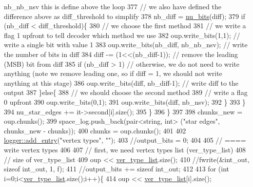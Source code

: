 \begin{DoxyCode}
{       nb\_nb\_nsv this is define above the loop}
377         \textcolor{comment}{// we also have defined the difference above as diff\_threshold to simplify}
378         nb\_diff = \hyperlink{bitstream_8cpp_a9dfce6f51e3febb3973aa3b16c2fecb4}{nu\_bits}(diff);
379         \textcolor{keywordflow}{if} (nb\_diff < diff\_threshold)\{
380           \textcolor{comment}{// we choose the first method}
381           \textcolor{comment}{// we write a flag 1 upfront to tell decoder which method we use}
382           oup.write\_bits(1,1); \textcolor{comment}{// write a single bit with value 1}
383           oup.write\_bits(nb\_diff, nb\_nb\_nsv); \textcolor{comment}{// write the number of bits in diff }
384           diff -= (1<<(nb\_diff-1)); \textcolor{comment}{// remove the leading (MSB) bit from diff}
385           \textcolor{keywordflow}{if} (nb\_diff > 1) \textcolor{comment}{// otherwise, we do not need to write anything (note we remove leading one, so
       if diff = 1, we should not write anything at this stage)}
386             oup.write\_bits(diff, nb\_diff-1); \textcolor{comment}{// write diff to the output}
387         \}\textcolor{keywordflow}{else}\{
388           \textcolor{comment}{// we should choose the second method}
389           \textcolor{comment}{// write a flag 0 upfront}
390           oup.write\_bits(0,1);
391           oup.write\_bits(diff, nb\_nsv);
392         \}
393       \}
394       nu\_star\_edges += it->second[i].size();
395     \}
396   \}
397   
398   chunks\_new = oup.chunks();
399   space\_log.push\_back(pair<string, int> (\textcolor{stringliteral}{"star edges"}, chunks\_new - chunks));
400   chunks = oup.chunks();
401 
402   \hyperlink{classlogger_a710163deb17bc81f70d53d285b8ac9ac}{logger::add\_entry}(\textcolor{stringliteral}{"vertex types"}, \textcolor{stringliteral}{""});
403   \textcolor{comment}{//output\_bits = 0;}
404   
405   \textcolor{comment}{// ==== write vertex types}
406 
407   \textcolor{comment}{// first, we need vertex types list (ver\_type\_list)}
408   \textcolor{comment}{// size of ver\_type\_list}
409   oup <<  \hyperlink{classmarked__graph__compressed_af2e3e55223d436628a02758dfae88493}{ver\_type\_list}.size();
410   \textcolor{comment}{//fwrite(&int\_out, sizeof int\_out, 1, f);}
411   \textcolor{comment}{//output\_bits += sizeof int\_out;}
412 
413   \textcolor{keywordflow}{for} (\textcolor{keywordtype}{int} i=0;i<\hyperlink{classmarked__graph__compressed_af2e3e55223d436628a02758dfae88493}{ver\_type\_list}.size();i++)\{
414     oup << \hyperlink{classmarked__graph__compressed_af2e3e55223d436628a02758dfae88493}{ver\_type\_list}[i].size();

\end{DoxyCode}
